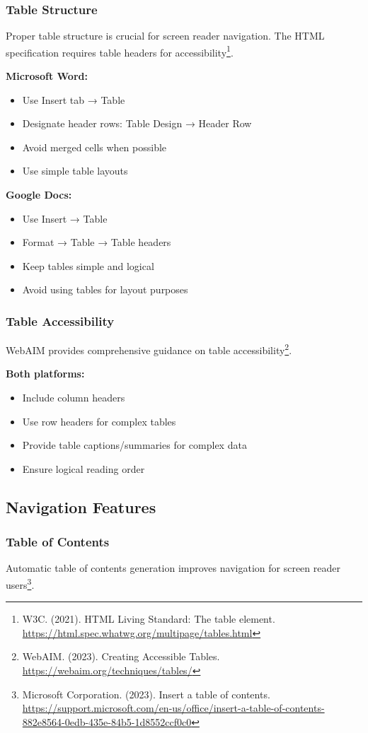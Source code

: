 \subsubsection{Table Structure}
Proper table structure is crucial for screen reader navigation. The HTML specification requires table headers for accessibility\footnote{W3C. (2021). HTML Living Standard: The table element. \url{https://html.spec.whatwg.org/multipage/tables.html}}.

\textbf{Microsoft Word:}
\begin{itemize}
\item Use Insert tab → Table
\item Designate header rows: Table Design → Header Row
\item Avoid merged cells when possible
\item Use simple table layouts
\end{itemize}

\textbf{Google Docs:}
\begin{itemize}
\item Use Insert → Table
\item Format → Table → Table headers
\item Keep tables simple and logical
\item Avoid using tables for layout purposes
\end{itemize}

\subsubsection{Table Accessibility}
WebAIM provides comprehensive guidance on table accessibility\footnote{WebAIM. (2023). Creating Accessible Tables. \url{https://webaim.org/techniques/tables/}}.

\textbf{Both platforms:}
\begin{itemize}
\item Include column headers
\item Use row headers for complex tables
\item Provide table captions/summaries for complex data
\item Ensure logical reading order
\end{itemize}

\subsection{Navigation Features}

\subsubsection{Table of Contents}
Automatic table of contents generation improves navigation for screen reader users\footnote{Microsoft Corporation. (2023). Insert a table of contents. \url{https://support.microsoft.com/en-us/office/insert-a-table-of-contents-882e8564-0edb-435e-84b5-1d8552ccf0c0}}.

